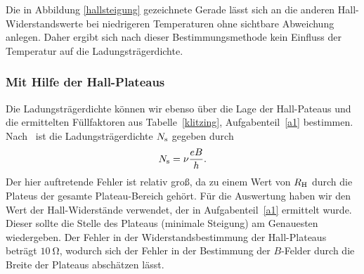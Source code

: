 \documentclass[paper=a4,fontsize=10pt,DIV=18,twocolumn,parskip=half]{scrartcl}
\numberwithin{equation}{section}    %
\begin{document}
Die in Abbildung \ref{hallsteigung} gezeichnete Gerade lässt sich an die anderen Hall-Widerstandswerte bei niedrigeren Temperaturen ohne sichtbare Abweichung anlegen. Daher ergibt sich nach dieser Bestimmungsmethode kein Einfluss der Temperatur auf die Ladungsträgerdichte.
\subsubsection*{Mit Hilfe der Hall-Plateaus}
Die Ladungsträgerdichte können wir ebenso über die Lage der Hall-Pateaus und die ermittelten Füllfaktoren aus Tabelle~\ref{klitzing}, Aufgabenteil~\ref{a1} bestimmen. Nach~\citet{anleitung} ist die Ladungsträgerdichte $N_{\rm s}$ gegeben durch
\begin{equation}
	N_{\rm s} = \nu\frac{e B}{h}.
\end{equation}
Der hier auftretende Fehler ist relativ groß, da zu einem Wert von $R_{\rm H}$ durch die Plateus der gesamte Plateau-Bereich gehört. Für die Auswertung haben wir den Wert der Hall-Widerstände verwendet, der in Aufgabenteil~\ref{a1} ermittelt wurde. Dieser sollte die Stelle des Plateaus (minimale Steigung) am Genauesten wiedergeben. Der Fehler in der Widerstandsbestimmung der Hall-Plateaus beträgt $\SI{10}{\ohm}$, wodurch sich der Fehler in der Bestimmung der $B$-Felder durch die Breite der Plateaus abschätzen lässt.
\end{document}
